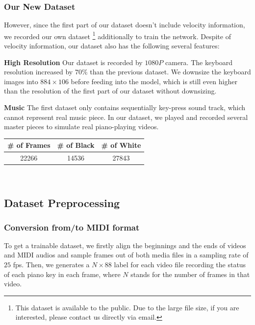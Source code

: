 \documentclass[10pt,twocolumn,letterpaper]{article}
\begin{document}
   \subsubsection{Our New Dataset}

   However, since the first part of our dataset doesn't include velocity information, we recorded our own dataset \footnote{This dataset is available to the public. Due to the large file size, if you are interested, please contact us directly via email.} additionally to train the network.
   Despite of velocity information, our dataset also has the following several features:

   \textbf{High Resolution} Our dataset is recorded by $1080P$ camera. The keyboard resolution increased by $70\%$ than the previous dataset. We downsize the keyboard images into \(884 \times 106\) before feeding into the model, which is still even higher than the resolution of the first part of our dataset without downsizing.

   \textbf{Music} The first dataset only contains sequentially key-press sound track, which cannot represent real music piece. 
   In our dataset, we played and recorded several master pieces to simulate real piano-playing videos.\\

   \begin{minipage}{0.9\linewidth}
      \centering
   \begin{tabular}{ccc}
      \toprule
      \# of Frames&\# of Black&\# of White\\
      \midrule
      22266&14536&27843\\
      \bottomrule
      \end{tabular}
       \label{tab:ourdataset} 
   \end{minipage}\\

   
\subsection{Dataset Preprocessing}

\subsubsection{Conversion from/to MIDI format}

To get a trainable dataset, we firstly align the beginnings and the ends of videos and MIDI audios and sample frames out of both media files in a sampling rate of $25$ fps. 
Then, we generates a \(N \times 88\) label for each video file recording the status of each piano key in each frame, where \(N\) stands for the number of frames in that video.
\end{document}
